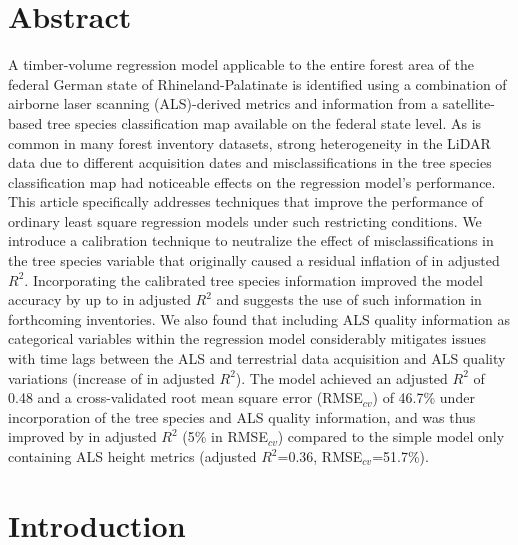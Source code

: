 \section*{Abstract}
\label{chap:regmod:Abstract}
A timber-volume regression model applicable to the entire forest area of the federal German state of Rhineland-Palatinate is identified using a combination of airborne laser scanning (ALS)-derived metrics and information from a satellite-based tree species classification map available on the federal state level. As is common in many forest inventory datasets, strong heterogeneity in the LiDAR data due to different acquisition dates and misclassifications in the tree species classification map had noticeable effects on the regression model's performance. This article specifically addresses techniques that improve the performance of ordinary least square regression models under such restricting conditions. We introduce a calibration technique to neutralize the effect of misclassifications in the tree species variable that originally caused a residual inflation of  in adjusted $R^2$. Incorporating the calibrated tree species information improved the model accuracy by up to  in adjusted $R^2$ and suggests the use of such information in forthcoming inventories. We also found that including ALS quality information as categorical variables within the regression model considerably mitigates issues with time lags between the ALS and terrestrial data acquisition and ALS quality variations (increase of  in adjusted $R^2$). The model achieved an adjusted $R^2$ of 0.48 and a cross-validated root mean square error (RMSE$_{cv}$) of 46.7\% under incorporation of the tree species and ALS quality information, and was thus improved by  in adjusted $R^2$ (5\% in RMSE$_{cv}$) compared to the simple model only containing ALS height metrics (adjusted $R^2$=0.36, RMSE$_{cv}$=51.7\%).



\section{Introduction}
\label{sec:intro}

